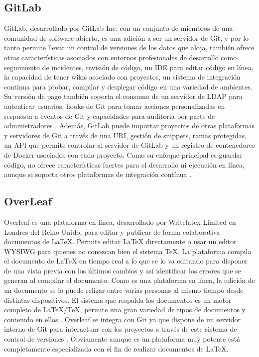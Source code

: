 \subsection{GitLab}
GitLab, desarrollado por GitLab Inc. con un conjunto de miembros de una comunidad de software abierto, es una adición a ser un servidor de Git, y por lo tanto permite llevar un control de versiones de los datos que aloja, también ofrece otras características asociados con entornos profesionales de desarrollo como seguimiento de incidentes, revisión de código, un IDE para editar código en línea, la capacidad de tener wikis asociado con proyectos, un sistema de integración continua para probar, compilar y desplegar código en una variedad de ambientes. Su versión de pago también soporta el consumo de un servidor de LDAP para autenticar usuarios, hooks de Git para tomar acciones personalizadas en respuesta a eventos de Git y capacidades para auditoria por parte de administradores \citep{GitLab}. Además, GitLab puede importar proyectos de otras plataformas y servidores de Git a través de una URI, gestión de snippets, ramas protegidas, un API que permite controlar al servidor de GitLab y un registro de contenedores de Docker asociados con cada proyecto. Como su enfoque principal es guardar código,  no ofrece características fuertes para el desarrollo  ni ejecución en línea, aunque si soporta otros plataformas de integración contínua \citep{GitLab-Features}.

\subsection{OverLeaf}
Overleaf es una plataforma en línea, desarrollado por Writelatex Limited en Londres del Reino Unido, para editar y publicar de forma colaborativa documentos de \LaTeX{}. Permite editar \LaTeX{} directamente o usar un editor WYSIWG para quienes no conozcan bien el sistema \TeX{}. La plataforma compila el documento de \LaTeX{} en tiempo real a lo que se lo va editando para disponer de una vista previa con los últimos cambios y así identificar los errores que se generan al compilar el documento. Como es una plataforma en línea, la edición de un documento se lo puede relizar entre varias personas al mismo tiempo desde distintas dispositivos. El sistema que respalda los documentos es un motor completo de \LaTeX{}/\TeX{}, permite una gran variedad de tipos de documentos y contenido en ellos \citep{Overleaf}. Overleaf se integra con Git ya que dispone de un servidor interno de Git para interactuar con los proyectos a través de este sistema de control de versiones \citep{Overleaf-Git}. Obviamente aunque es un plataforma muy potente está completamente especializada con el fin de realizar documentos de \LaTeX{}.

